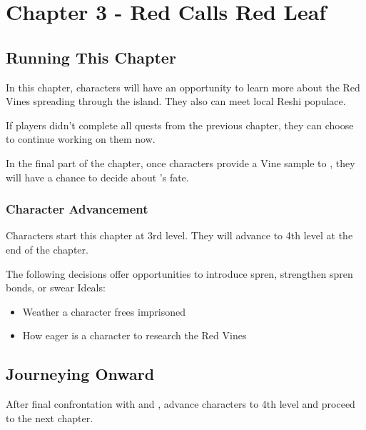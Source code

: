 \chapter{Chapter 3 - Red Calls Red Leaf}
\label{chap:sickGirlDies}

\setcounter{section}{-1}
\section{Running This Chapter}

In this chapter, characters will have an opportunity to learn more about the Red Vines spreading through the island. They also can meet local Reshi populace.

If players didn't complete all quests from the previous chapter, they can choose to continue working on them now.

In the final part of the chapter, once characters provide a Vine sample to \npcMedic{}, they will have a chance to decide about \npcSickGirl{}'s fate.

\subsection{Character Advancement}

Characters start this chapter at 3rd level. They will advance to 4th level at the end of the chapter.

The following decisions offer opportunities to introduce spren, strengthen spren bonds, or swear Ideals:
\begin{itemize}
	\item Weather a character frees imprisoned \npcCapturedExplorer{}
	\item How eager is a character to research the Red Vines
\end{itemize}






\newpage


\section{Journeying Onward}

After final confrontation with \npcMedic{} and \npcBabsk{}, advance characters to 4th level and proceed to the next chapter.